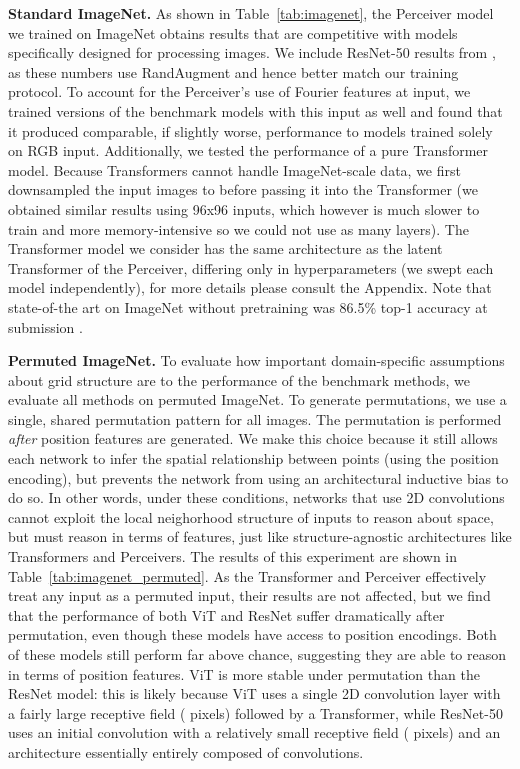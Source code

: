 \documentclass{article}
\begin{document}
\noindent \textbf{Standard ImageNet.} As shown in Table~\ref{tab:imagenet}, the Perceiver model we trained on ImageNet obtains results that are competitive with models specifically designed for processing images. We include ResNet-50 results from \cite{cubuk2020randaugment}, as these numbers use RandAugment and hence better match our training protocol. To account for the Perceiver's use of Fourier features at input, we trained versions of the benchmark models with this input as well and found that it produced comparable, if slightly worse, performance to models trained solely on RGB input. Additionally, we tested the performance of a pure Transformer model. Because Transformers cannot handle ImageNet-scale data, we first downsampled the input images to  before passing it into the Transformer (we obtained similar results using 96x96 inputs, which however is much slower to train and more memory-intensive so we could not use as many layers). The Transformer model we consider has the same architecture as the latent Transformer of the Perceiver, differing only in hyperparameters (we swept each model independently), for more details please consult the Appendix. Note that state-of-the art on ImageNet without pretraining was 86.5\% top-1 accuracy at submission \cite{brock2021high}.

\noindent \textbf{Permuted ImageNet.} To evaluate how important domain-specific assumptions about grid structure are to the performance of the benchmark methods, we evaluate all methods on permuted ImageNet. To generate permutations, we use a single, shared permutation pattern for all images. The permutation is performed \textit{after} position features are generated. We make this choice because it still allows each network to infer the spatial relationship between points (using the position encoding), but prevents the network from using an architectural inductive bias to do so. In other words, under these conditions, networks that use 2D convolutions cannot exploit the local neighorhood structure of inputs to reason about space, but must reason in terms of features, just like structure-agnostic architectures like Transformers and Perceivers. The results of this experiment are shown in Table~\ref{tab:imagenet_permuted}. As the Transformer and Perceiver effectively treat any input as a permuted input, their results are not affected, but we find that the performance of both ViT and ResNet suffer dramatically after permutation, even though these models have access to position encodings. Both of these models still perform far above chance, suggesting they are able to reason in terms of position features. ViT is more stable under permutation than the ResNet model: this is likely because ViT uses a single 2D convolution layer with a fairly large receptive field ( pixels) followed by a Transformer, while ResNet-50 uses an initial convolution with a relatively small receptive field ( pixels) and an architecture essentially entirely composed of convolutions.
\end{document}
